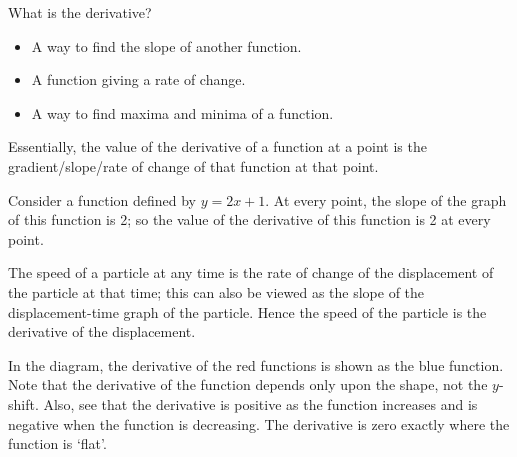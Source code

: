 




What is the derivative?
\begin{itemize}
  \item A way to find the slope of another function.
  \item A function giving a rate of change.
  \item A way to find maxima and minima of a function.
\end{itemize}
Essentially, the value of the derivative of a function at a point is the gradient/slope/rate of change of that function at that point.

\begin{ex}
  Consider a function defined by $ y = 2x + 1 $. At every point, the slope of the graph of this function is 2; so
  the value of the derivative of this function is 2 at every point.
\end{ex}

\begin{ex}
  The speed of a particle at any time is the rate of change of the displacement of the particle at that time;
  this can also be viewed as the slope of the displacement-time graph of the particle. Hence the speed of the
  particle is the derivative of the displacement.
\end{ex}

\begin{ex}
  In the diagram, the derivative of the red functions is shown as the blue function. Note
  that the derivative of the function depends only upon the shape, not the $ y$-shift. Also,
  see that the derivative is positive as the function increases and is negative when the
  function is decreasing. The derivative is zero exactly where the function is `flat'.

  \begin{center}
  \end{center}
\end{ex}

